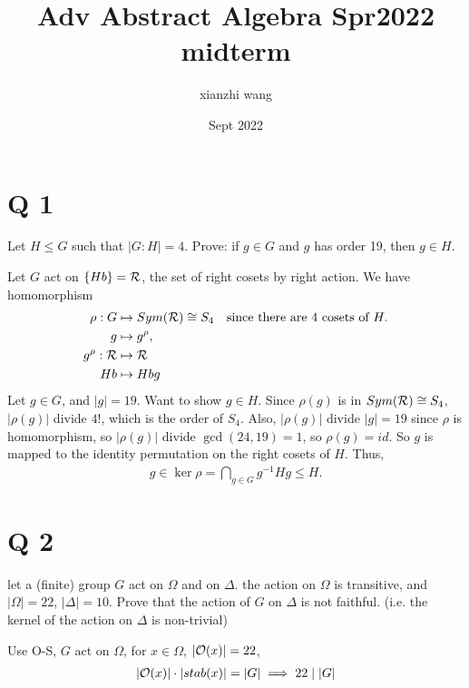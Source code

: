 \documentclass[12pt,english]{article}
\title{Adv Abstract Algebra Spr2022 midterm}
\author{xianzhi wang}
\date{Sept 2022}
\begin{document}
\maketitle

\section*{Q 1}
\begin{question}
Let $H \leq G$ such that $|G:H| = 4$. Prove: if $g \in G$ and $g$ has order 19, then $g \in H$. 
\end{question}
Let $G$ act on $\left\{ Hb \right\} = \mathcal R$, the set of right cosets by right action. We have homomorphism 
\begin{align*}
    \rho: G &\mapsto Sym(\mathcal R) \cong S_4 \quad \text{since there are 4 cosets of } H.\\
    g &\mapsto g^{\rho},\\
    g^{\rho}: \mathcal R &\mapsto \mathcal R\\
    Hb &\mapsto Hbg
\end{align*}
Let $g \in G$, and $|g| = 19$. Want to show $g \in H$. Since $\rho(g)$ is in $Sym(\mathcal R) \cong S_4$, $|\rho(g)|$ divide $4!$, which is the order of $S_4$. Also, $|\rho(g)|$ divide $|g| = 19$ since $\rho$ is homomorphism, so $|\rho(g)|$ divide $\gcd (24,19) = 1$, so $\rho(g) = id$. So $g$ is mapped to the identity permutation on the right cosets of $H$. Thus, 
\begin{align*}
    g \in \ker \rho = \bigcap_{g \in G} g^{-1}Hg \leq H. 
\end{align*}










\section*{Q 2}
\begin{question}
let a (finite) group $G$ act on $\Omega$ and on $\Delta$. the action on $\Omega$ is transitive, and $|\Omega| = 22$, $|\Delta| = 10$. Prove that the action of $G$ on $\Delta$ is not faithful. (i.e. the kernel of the action on $\Delta$ is non-trivial)
\end{question}
Use O-S, $G$ act on $\Omega$, for $x \in \Omega$, $|\mathcal O(x)| = 22$,
\begin{align*}
    |\mathcal O(x)| \cdot |stab(x)| = |G| \implies 22 \mid |G|
\end{align*}
\end{document}
